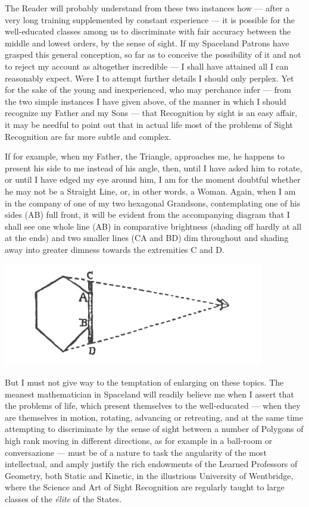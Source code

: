 \documentclass[10pt, kindle, oneside]{kindle}
\begin{document}
The Reader will probably understand from these
two instances how --- after a very long training supplemented by constant
experience --- it is possible for the well-educated classes among us to
discriminate with fair accuracy between the middle and lowest orders, by the
sense of sight. If my Spaceland Patrons have grasped this general conception,
so far as to conceive the possibility of it and not to reject my account as
altogether incredible --- I shall have attained all I can reasonably expect.
Were I to attempt further details I should only perplex. Yet for the sake of
the young and inexperienced, who may perchance infer --- from the two simple
instances I have given above, of the manner in which I should recognize my
Father and my Sons --- that Recognition by sight is an easy affair, it may be
needful to point out that in actual life most of the problems of Sight
Recognition are far more subtle and complex.

If for example, when my Father, the Triangle, approaches me, he happens to
present his side to me instead of his angle, then, until I have asked him to
rotate, or until I have edged my eye around him, I am for the moment doubtful
whether he may not be a Straight Line, or, in other words, a Woman. Again,
when I am in the company of one of my two hexagonal Grandsons, contemplating
one of his sides (AB) full front, it will be evident from the accompanying
diagram that I shall see one whole line (AB) in comparative brightness
(shading off hardly at all at the ends) and two smaller lines (CA and BD) dim
throughout and shading away into greater dimness towards the extremities C and
D. 
\begin{center}
    \includegraphics[trim=0mm 0mm 0mm 0mm, scale=0.5]{fig4}
\end{center}


But I must not give way to the temptation of enlarging on these
topics. The meanest mathematician in Spaceland will readily believe me when I
assert that the problems of life, which present themselves to the
well-educated --- when they are themselves in motion, rotating, advancing or
retreating, and at the same time attempting to discriminate by the sense of
sight between a number of Polygons of high rank moving in different
directions, as for example in a ball-room or conversazione --- must be of a
nature to task the angularity of the most intellectual, and amply justify the
rich endowments of the Learned Professors of Geometry, both Static and
Kinetic, in the illustrious University of Wentbridge, where the Science and
Art of Sight Recognition are regularly taught to large classes of the 
\emph{{\'e}lite} of the States.
\end{document}
